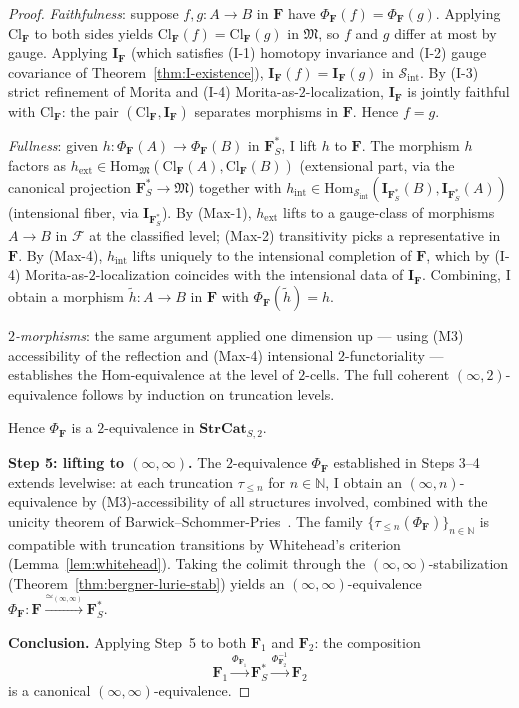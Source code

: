 \documentclass[11pt]{article}
\theoremstyle{plain}
\theoremstyle{definition}
\newcommand{\cS}{\mathcal{S}}
\newcommand{\cF}{\mathcal{F}}
\newcommand{\fM}{\mathfrak{M}}
\newcommand{\Sint}{\cS_{\mathrm{int}}}
\newcommand{\Hom}{\mathrm{Hom}}
\newcommand{\Cl}{\mathrm{Cl}}
\newcommand{\II}{\mathbf{I}}
\begin{document}
\begin{proof}
\emph{Faithfulness}: suppose $f, g : A \to B$ in $\mathbf{F}$ have $\Phi_\mathbf{F}(f) = \Phi_\mathbf{F}(g)$. Applying $\Cl_\mathbf{F}$ to both sides yields $\Cl_\mathbf{F}(f) = \Cl_\mathbf{F}(g)$ in $\fM$, so $f$ and $g$ differ at most by gauge. Applying $\II_\mathbf{F}$ (which satisfies (I-1) homotopy invariance and (I-2) gauge covariance of Theorem~\ref{thm:I-existence}), $\II_\mathbf{F}(f) = \II_\mathbf{F}(g)$ in $\Sint$. By (I-3) strict refinement of Morita and (I-4) Morita-as-$2$-localization, $\II_\mathbf{F}$ is jointly faithful with $\Cl_\mathbf{F}$: the pair $(\Cl_\mathbf{F}, \II_\mathbf{F})$ separates morphisms in $\mathbf{F}$. Hence $f = g$.

\emph{Fullness}: given $h : \Phi_\mathbf{F}(A) \to \Phi_\mathbf{F}(B)$ in $\mathbf{F}_S^*$, I lift $h$ to $\mathbf{F}$. The morphism $h$ factors as $h_{\mathrm{ext}} \in \Hom_\fM(\Cl_\mathbf{F}(A), \Cl_\mathbf{F}(B))$ (extensional part, via the canonical projection $\mathbf{F}_S^* \to \fM$) together with $h_{\mathrm{int}} \in \Hom_{\Sint}(\II_{\mathbf{F}_S^*}(B), \II_{\mathbf{F}_S^*}(A))$ (intensional fiber, via $\II_{\mathbf{F}_S^*}$). By (Max-1), $h_{\mathrm{ext}}$ lifts to a gauge-class of morphisms $A \to B$ in $\cF$ at the classified level; (Max-2) transitivity picks a representative in $\mathbf{F}$. By (Max-4), $h_{\mathrm{int}}$ lifts uniquely to the intensional completion of $\mathbf{F}$, which by (I-4) Morita-as-$2$-localization coincides with the intensional data of $\II_\mathbf{F}$. Combining, I obtain a morphism $\tilde h : A \to B$ in $\mathbf{F}$ with $\Phi_\mathbf{F}(\tilde h) = h$.

\emph{$2$-morphisms}: the same argument applied one dimension up --- using (M3) accessibility of the reflection and (Max-4) intensional $2$-functoriality --- establishes the Hom-equivalence at the level of $2$-cells. The full coherent $(\infty, 2)$-equivalence follows by induction on truncation levels.

Hence $\Phi_\mathbf{F}$ is a $2$-equivalence in $\mathbf{StrCat}_{S, 2}$.

\textbf{Step 5: lifting to $(\infty, \infty)$.} The $2$-equivalence $\Phi_\mathbf{F}$ established in Steps 3--4 extends levelwise: at each truncation $\tau_{\leq n}$ for $n \in \mathbb{N}$, I obtain an $(\infty, n)$-equivalence by (M3)-accessibility of all structures involved, combined with the unicity theorem of Barwick--Schommer-Pries~\cite{BarwickSchommerPries2021}. The family $\{\tau_{\leq n}(\Phi_\mathbf{F})\}_{n \in \mathbb{N}}$ is compatible with truncation transitions by Whitehead's criterion (Lemma~\ref{lem:whitehead}). Taking the colimit through the $(\infty, \infty)$-stabilization (Theorem~\ref{thm:bergner-lurie-stab}) yields an $(\infty, \infty)$-equivalence $\Phi_\mathbf{F} : \mathbf{F} \xrightarrow{\simeq_{(\infty, \infty)}} \mathbf{F}_S^*$.

\textbf{Conclusion.} Applying Step~5 to both $\mathbf{F}_1$ and $\mathbf{F}_2$: the composition
\[ \mathbf{F}_1 \xrightarrow{\Phi_{\mathbf{F}_1}} \mathbf{F}_S^* \xrightarrow{\Phi_{\mathbf{F}_2}^{-1}} \mathbf{F}_2 \]
is a canonical $(\infty, \infty)$-equivalence.
\end{proof}
\end{document}
